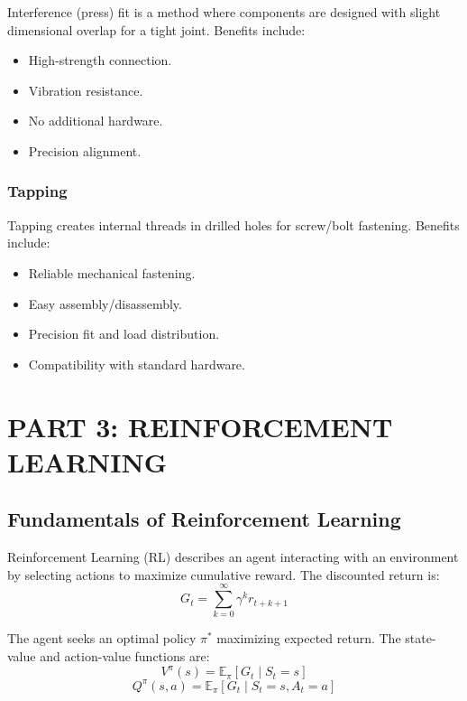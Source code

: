 Interference (press) fit is a method where components are designed with slight dimensional overlap for a tight joint. Benefits include:
\begin{itemize}
    \item High-strength connection.
    \item Vibration resistance.
    \item No additional hardware.
    \item Precision alignment.
\end{itemize}

\subsubsection*{Tapping}

Tapping creates internal threads in drilled holes for screw/bolt fastening. Benefits include:
\begin{itemize}
    \item Reliable mechanical fastening.
    \item Easy assembly/disassembly.
    \item Precision fit and load distribution.
    \item Compatibility with standard hardware.
\end{itemize}

\section{PART 3: REINFORCEMENT LEARNING}

\subsection{Fundamentals of Reinforcement Learning}

Reinforcement Learning (RL) describes an agent interacting with an environment by selecting actions to maximize cumulative reward. The discounted return is:
\begin{equation}
G_t = \sum_{k=0}^{\infty} \gamma^k r_{t+k+1}
\end{equation}

The agent seeks an optimal policy $\pi^*$ maximizing expected return. The state-value and action-value functions are:
\begin{equation}
V^{\pi}(s) = \mathbb{E}_{\pi}[G_t \mid S_t = s]
\end{equation}
\begin{equation}
Q^{\pi}(s,a) = \mathbb{E}_{\pi}[G_t \mid S_t = s, A_t = a]
\end{equation}

